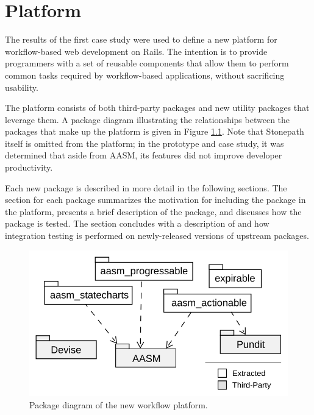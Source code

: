 \documentclass[document.tex]{subfiles}
\begin{document}
\chapter{Platform}
\label {ch:platform}


The results of the first case study were used to define a new platform for workflow-based web development on Rails. The intention is to provide programmers with a set of reusable components that allow them to perform common tasks required by workflow-based applications, without sacrificing usability.

The platform consists of both third-party packages and new utility packages that leverage them. A package diagram illustrating the relationships between the packages that make up the platform is given in Figure \ref{fig:platform-package-diagram}. Note that Stonepath itself is omitted from the platform; in the prototype and case study, it was determined that aside from AASM, its features did not improve developer productivity. 

Each new package is described in more detail in the following sections. The section for each package summarizes the motivation for including the package in the platform, presents a brief description of the package, and discusses how the package is tested. The section concludes with a description of  and how integration testing is performed on newly-released versions of upstream packages.

\begin{figure}[!ht]
\centering \includegraphics[width=4.5in]{./img/platform/platform-package-diagram}
\caption{Package diagram of the new workflow platform.}
\label{fig:platform-package-diagram}
\end{figure}
\end{document}
